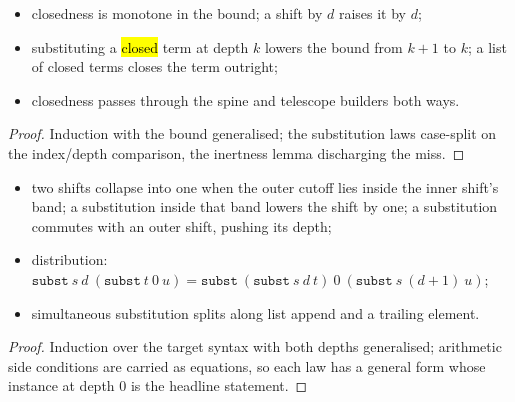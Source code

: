 \begin{lemma}
\label{lem:LBClosed-substList}
\leanok
{}
\begin{itemize}
\item closedness is monotone in the bound; a shift by $d$ raises it by $d$;
\item substituting a \hl{closed} term at depth $k$ lowers the bound from $k+1$ to $k$; a list of closed terms closes the term outright;
\item closedness passes through the spine and telescope builders both ways.
\end{itemize}
\end{lemma}
\begin{proof}
\leanok
{}
 Induction with the bound generalised; the substitution laws case-split on the index/depth comparison, the inertness lemma discharging the miss.
\end{proof}

\begin{lemma}
\label{lem:LBTerm-subst_subst}
\leanok
{}
\begin{itemize}
\item two shifts collapse into one when the outer cutoff lies inside the inner shift's band; a substitution inside that band lowers the shift by one; a substitution commutes with an outer shift, pushing its depth;
\item distribution: $\mathtt{subst}\ s\ d\ (\mathtt{subst}\ t\ 0\ u) = \mathtt{subst}\ (\mathtt{subst}\ s\ d\ t)\ 0\ (\mathtt{subst}\ s\ (d+1)\ u)$;
\item simultaneous substitution splits along list append and a trailing element.
\end{itemize}
\end{lemma}
\begin{proof}
\leanok
{}
 Induction over the target syntax with both depths generalised; arithmetic side conditions are carried as equations, so each law has a general form whose instance at depth $0$ is the headline statement.
\end{proof}

